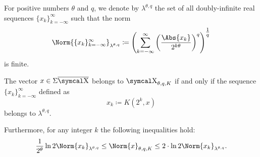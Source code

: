 \begin{definition}\label{def:discrete_k_interpolation_space}
  For positive numbers \( \theta \) and \( q \), we denote by \( \lambda^{\theta,q} \) the set of all doubly-infinite real sequences \( \{ x_k \}_{k=-\infty}^\infty \) such that the norm
  \begin{equation}\label{eq:def:discrete_k_interpolation_space}
    \Norm{\{ x_k \}_{k=-\infty}^\infty}_{\lambda^{\theta,q}} \coloneqq \left( \sum_{k=-\infty}^\infty \left( \frac {\Abs{x_k}} {2^{k\theta}} \right)^q \right)^{\tfrac 1 q}
  \end{equation}
  is finite.
\end{definition}

\begin{theorem}\label{thm:discrete_k_interpolation}
  The vector \( x \in \Sigma\Ol{\CX} \) belongs to \hyperref[def:k_functional_interpolation_space]{\( \CX_{\theta,q,K} \)} if and only if the sequence \( \{ x_k \}_{k=-\infty}^\infty \) defined as
  \begin{equation}\label{eq:thm:discrete_k_interpolation/sequence}
    x_k \coloneqq K(2^k, x)
  \end{equation}
  belongs to \hyperref[def:discrete_k_interpolation_space]{\( \lambda^{\theta,q} \)}.

  Furthermore, for any integer \( k \) the following inequalities hold:
  \begin{equation}\label{eq:thm:discrete_k_interpolation/inequalities}
    \frac 1 {2^\theta} \ln 2 \Norm{x_k}_{\lambda^{\theta,q}}
    \leq
    \Norm{x}_{\theta,q,K}
    \leq
    2 \cdot \ln 2 \Norm{x_k}_{\lambda^{\theta,q}}.
  \end{equation}
\end{theorem}
